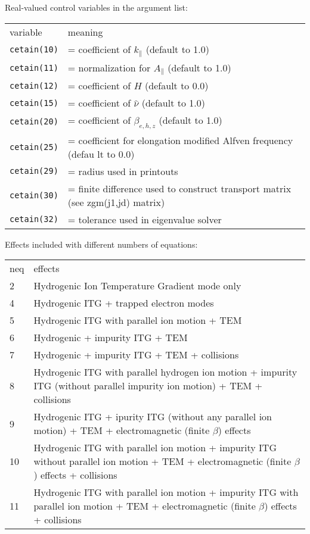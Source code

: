 \renewcommand{\arraystretch}{1.0}
\begin{center}
Real-valued control variables in the argument list:
\begin{tabular}{lp{4.0in}}
variable & meaning \\
{\tt cetain(10)} & = coefficient of $ k_\parallel $ (default to 1.0) \\
{\tt cetain(11)} & = normalization for $ A_\parallel $ (default to 1.0) \\
{\tt cetain(12)} & = coefficient of $H$ (default to 0.0) \\
{\tt cetain(15)} & = coefficient of $ \hat{\nu} $ (default to 1.0) \\
{\tt cetain(20)} & = coefficient of $ \beta_{e,h,z} $ (default to 1.0) \\
{\tt cetain(25)} & = coefficient for elongation modified Alfven frequency (defau
lt to 0.0) \\
{\tt cetain(29)} & = radius used in printouts \\
{\tt cetain(30)} & = finite difference used to construct
                   transport matrix (see zgm(j1,jd) matrix) \\
{\tt cetain(32)} & = tolerance used in eigenvalue solver \\

\end{tabular}
\end{center}

\renewcommand{\arraystretch}{1.0}
\begin{center}
Effects included with different numbers of equations:
\begin{tabular}{lp{5.0in}}
neq & effects \\
2 & Hydrogenic Ion Temperature Gradient mode only \\
4 & Hydrogenic ITG + trapped electron modes \\
5 & Hydrogenic ITG with parallel ion motion + TEM \\
6 & Hydrogenic + impurity ITG + TEM \\
7 & Hydrogenic + impurity ITG + TEM + collisions \\
8 & Hydrogenic ITG with parallel hydrogen ion motion
  + impurity ITG (without parallel impurity ion motion)
  + TEM + collisions\\
9 & Hydrogenic ITG + ipurity ITG (without any parallel ion motion)
  + TEM + electromagnetic (finite $\beta$) effects \\
10 & Hydrogenic ITG with parallel ion motion
  + impurity ITG without parallel ion motion
  + TEM + electromagnetic (finite $\beta$) effects + collisions \\
11 & Hydrogenic ITG with parallel ion motion
  + impurity ITG with parallel ion motion
  + TEM + electromagnetic (finite $\beta$) effects + collisions \\

\end{tabular}
\end{center}


